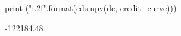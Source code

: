\begin{ipython}
print ("{:.2f}".format(cds.npv(dc, credit_curve)))
\end{ipython}
\begin{ioutput}
-122184.48
\end{ioutput}
	
%
%
%
%
%
%
%
